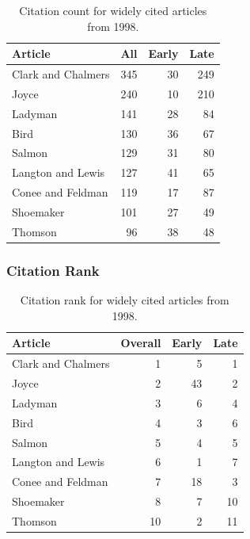 \documentclass[
  10pt,
  letterpaper,
  DIV=11,
  numbers=noendperiod,
  twoside]{scrartcl}
\begin{document}
\begin{longtable}[]{@{}lrrr@{}}

\caption{\label{tbl-citation-count-1998}Citation count for widely cited
articles from 1998.}

\tabularnewline

\toprule\noalign{}
Article & All & Early & Late \\
\midrule\noalign{}
\endhead
\bottomrule\noalign{}
\endlastfoot
Clark and Chalmers & 345 & 30 & 249 \\
Joyce & 240 & 10 & 210 \\
Ladyman & 141 & 28 & 84 \\
Bird & 130 & 36 & 67 \\
Salmon & 129 & 31 & 80 \\
Langton and Lewis & 127 & 41 & 65 \\
Conee and Feldman & 119 & 17 & 87 \\
Shoemaker & 101 & 27 & 49 \\
Thomson & 96 & 38 & 48 \\

\end{longtable}

\subsubsection*{Citation Rank}\label{sec-rank-1998}

\begin{longtable}[]{@{}lrrr@{}}

\caption{\label{tbl-citation-rank-1998}Citation rank for widely cited
articles from 1998.}

\tabularnewline

\toprule\noalign{}
Article & Overall & Early & Late \\
\midrule\noalign{}
\endhead
\bottomrule\noalign{}
\endlastfoot
Clark and Chalmers & 1 & 5 & 1 \\
Joyce & 2 & 43 & 2 \\
Ladyman & 3 & 6 & 4 \\
Bird & 4 & 3 & 6 \\
Salmon & 5 & 4 & 5 \\
Langton and Lewis & 6 & 1 & 7 \\
Conee and Feldman & 7 & 18 & 3 \\
Shoemaker & 8 & 7 & 10 \\
Thomson & 10 & 2 & 11 \\

\end{longtable}
\end{document}
